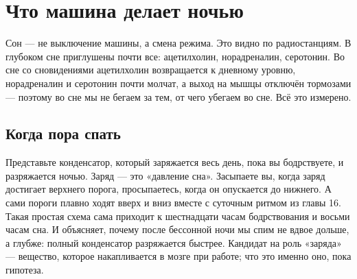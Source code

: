 \chapter{Что машина делает ночью}

Сон --- не выключение машины, а смена режима. Это видно по радиостанциям. В глубоком сне приглушены почти все: ацетилхолин, норадреналин, серотонин. Во сне со сновидениями ацетилхолин возвращается к дневному уровню, норадреналин и серотонин почти молчат, а выход на мышцы отключён тормозами --- поэтому во сне мы не бегаем за тем, от чего убегаем во сне. Всё это измерено.

\section*{Когда пора спать}

Представьте конденсатор, который заряжается весь день, пока вы бодрствуете, и разряжается ночью. Заряд --- это «давление сна». Засыпаете вы, когда заряд достигает верхнего порога, просыпаетесь, когда он опускается до нижнего. А сами пороги плавно ходят вверх и вниз вместе с суточным ритмом из главы 16. Такая простая схема сама приходит к шестнадцати часам бодрствования и восьми часам сна. И объясняет, почему после бессонной ночи мы спим не вдвое дольше, а глубже: полный конденсатор разряжается быстрее. Кандидат на роль «заряда» --- вещество, которое накапливается в мозге при работе; что это именно оно, пока гипотеза.


